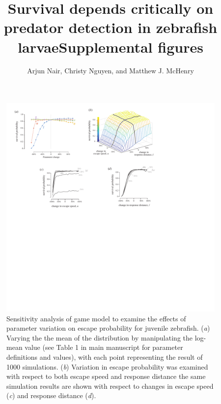 \documentclass[]{rsos}
\begin{document}
\title{Survival depends critically on predator detection in zebrafish larvae}

\author{%
Arjun Nair, Christy Nguyen, and Matthew J. McHenry}

\address{Department of Ecology and Evolutionary Biology\\
University of California, Irvine\\
321 Steinhaus Hall\\
Irvine, CA 92697}

\title{Supplemental figures}

\setcounter{figure}{0}
\renewcommand{\thefigure}{S\arabic{figure}}%

\begin{figure}[!h]
\centering
	\includegraphics[width=5.5in]{supp_fig_sensitivity}
\caption{Sensitivity analysis of game model to examine the effects of parameter variation on escape probability for juvenile zebrafish. 
(\textit{a}) Varying the the mean of the distribution by manipulating the log-mean value (see Table 1 in main manuscript for parameter definitions and values), with each point representing the result of 1000 simulations. 
(\textit{b}) Variation in escape probability was examined with respect to both escape speed and response distance the same simulation results are shown with respect to changes in escape speed (\textit{c}) and response distance (\textit{d}).
}
\label{supp_fig_sense}
\end{figure}
\end{document}
